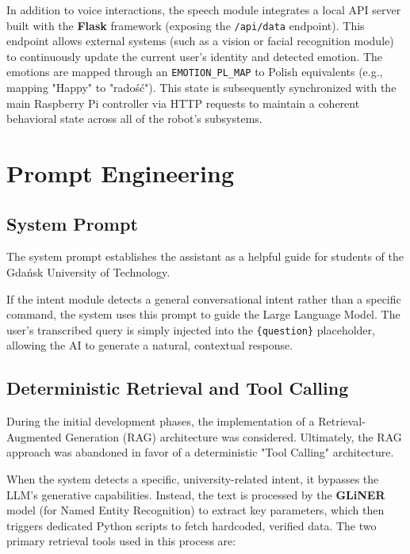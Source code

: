 \documentclass{article}
\begin{document}
	In addition to voice interactions, the speech module integrates a local API server built with the \textbf{Flask} framework (exposing the \texttt{/api/data} endpoint). This endpoint allows external systems (such as a vision or facial recognition module) to continuously update the current user's identity and detected emotion. The emotions are mapped through an \texttt{EMOTION\_PL\_MAP} to Polish equivalents (e.g., mapping "Happy" to "radość"). This state is subsequently synchronized with the main Raspberry Pi controller via HTTP requests to maintain a coherent behavioral state across all of the robot's subsystems.
	
	\section{Prompt Engineering}
	\subsection{System Prompt}
	The system prompt establishes the assistant as a helpful guide for students of the Gdańsk University of Technology. 
	
	If the intent module detects a general conversational intent rather than a specific command, the system uses this prompt to guide the Large Language Model. The user's transcribed query is simply injected into the \texttt{\{question\}} placeholder, allowing the AI to generate a natural, contextual response.
	\subsection{Deterministic Retrieval and Tool Calling}
	During the initial development phases, the implementation of a Retrieval-Augmented Generation (RAG) architecture was considered. Ultimately, the RAG approach was abandoned in favor of a deterministic "Tool Calling" architecture. 
	
	When the system detects a specific, university-related intent, it bypasses the LLM's generative capabilities. Instead, the text is processed by the \textbf{GLiNER} model (for Named Entity Recognition) to extract key parameters, which then triggers dedicated Python scripts to fetch hardcoded, verified data. The two primary retrieval tools used in this process are:
	
\end{document}
